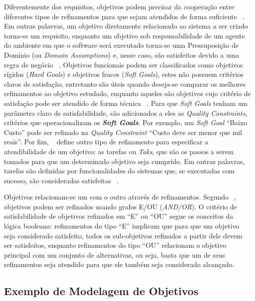 Diferentemente dos requisitos, objetivos podem precisar da cooperação entre diferentes tipos de refinamentos para que sejam atendidos de forma suficiente ~\cite{dardenne1993goal}. Em outras palavras, um objetivo diretamente relacionado ao sistema a ser criado torna-se um requisito, enquanto um objetivo sob responsabilidade de um agente do ambiente em que o software será executado torna-se uma Pressuposição de Domínio (ou \textit{Domain Assumptions}) e, nesse caso, são satisfeitos devido a uma regra de negócio ~\cite{van2001goal, van1998managing}. Objetivos funcionais podem ser classificados como objetivos rígidos (\textit{Hard Goals}) e objetivos fracos (\textit{Soft Goals}), estes não possuem critérios claros de satisfação, entretanto são úteis quando deseja-se comparar os melhores refinamentos ao objetivo estudado, enquanto aqueles são objetivos cujo critério de satisfação pode ser atendido de forma técnica ~\cite{dardenne1993goal}. Para que \textit{Soft Goals} tenham um parâmetro claro de satisfabilidade, são adicionados a eles as \textit{Quality Constraints}, critérios que operacionalizam os \textit{\textbf{Soft Goals}}. Por exemplo, um \textit{Soft Goal} ``Baixo Custo'' pode ser refinado na \textit{Quality Constraint} ``Custo deve ser menor que mil reais''. Por fim, ~\cite{jureta2008revisiting} define outro tipo de refinamento para especificar a atendibilidade de um objetivo: as tarefas ou \textit{Taks}, que são os passos a serem tomados para que um determinado objetivo seja cumprido. Em outras palavras, tarefas são definidas por funcionalidades do sistemas que, se executadas com sucesso, são consideradas satisfeitas ~\cite{souza2012requirement}.

Objetivos relacionam-se um com o outro através de refinamentos. Segundo ~\cite{dardenne1991goal, dardenne1993goal}, objetivos podem ser refinados usando grafos E/OU (\textit{AND/OR}). O critério de satisfabilidade de objetivos refinados em ``E'' ou ``OU'' segue os conceitos da lógica booleana: refinamentos do tipo ``E'' implicam que para que um objetivo seja considerado satisfeito, todos os sub-objetivos refinados a partir dele devem ser satisfeitos, enquanto refinamentos do tipo ``OU'' relacionam o objetivo principal com um conjunto de alternativas, ou seja, basta que um de seus refinamentos seja atendido para que ele também seja considerado alcançado.

\subsection{Exemplo de Modelagem de Objetivos}
\label{sec-referencial-engenharia-objetivos-exemplo}

